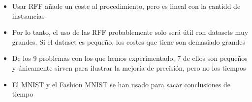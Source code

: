 \begin{note}
  \begin{itemize}
    \item Usar RFF añade un coste al procedimiento, pero es lineal con la
    cantidd de instsancias
    \item Por lo tanto, el uso de las RFF probablemente solo será útil con
    datasets muy grandes. Si el dataset es pequeño, los costes que tiene son
    demasiado grandes
    \item De los 9 problemas con los que hemos experimentado, 7 de ellos son
    pequeños y únicamente sirven para ilustrar la mejoría de precisión, pero
    no los tiempos
    \item El MNIST y el Fashion MNIST se han usado para sacar conclusiones de
    tiempo
  \end{itemize}
\end{note}
